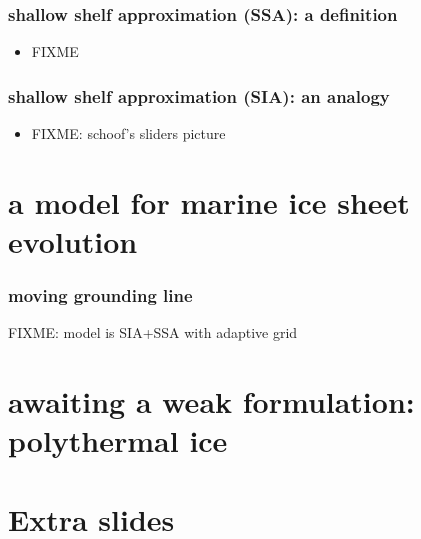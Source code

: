 \documentclass{beamer}
\begin{document}
\begin{frame}
  \frametitle{shallow shelf approximation (SSA): a definition}

\begin{itemize}
\item FIXME
\end{itemize}
\end{frame}


\begin{frame}
  \frametitle{shallow shelf approximation (SIA): an analogy}

\begin{itemize}
\item FIXME: schoof's sliders picture
\end{itemize}
\end{frame}


\section[marine ice sheets]{a model for marine ice sheet evolution}

\begin{frame}
  \frametitle{moving grounding line}

FIXME: model is SIA+SSA with adaptive grid

\begin{center}
\end{center}
\end{frame}


\section[polythermal ice]{awaiting a weak formulation: polythermal ice}


\section*{Extra slides}
\end{document}
